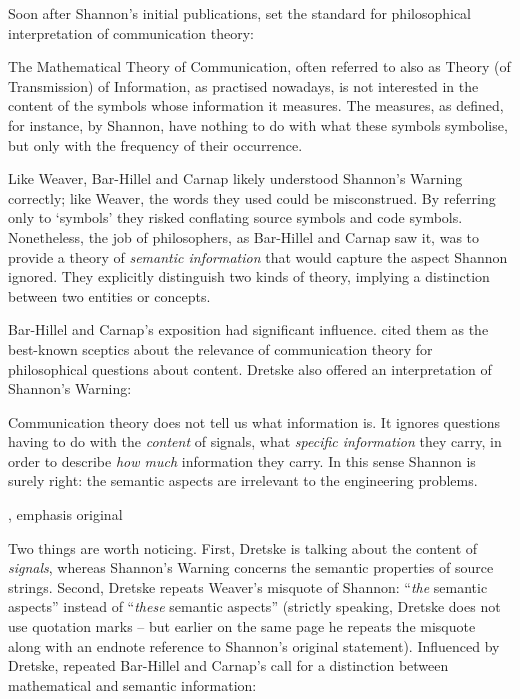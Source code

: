 \documentclass[12pt]{article}
\begin{document}
Soon after Shannon's initial publications, \citet{bar-hillel1953semantic} set the standard for philosophical interpretation of communication theory:

\begin{myquote}
The Mathematical Theory of Communication, often referred to also as Theory (of Transmission) of Information, as practised nowadays, is not interested in the content of the symbols whose information it measures. The measures, as defined, for instance, by Shannon, have nothing to do with what these symbols symbolise, but only with the frequency of their occurrence.
\par\hspace*{\fill}\citet[147]{bar-hillel1953semantic}
\end{myquote}

\noindent Like Weaver, Bar-Hillel and Carnap likely understood {\sc Shannon's Warning} correctly; like Weaver, the words they used could be misconstrued.
By referring only to `symbols' they risked conflating source symbols and code symbols.
Nonetheless, the job of philosophers, as Bar-Hillel and Carnap saw it, was to provide a theory of \textit{semantic information} that would capture the aspect Shannon ignored.
They explicitly distinguish two kinds of theory, implying a distinction between two entities or concepts.

Bar-Hillel and Carnap's exposition had significant influence.
\citet[p. 241, n.
1]{dretske1981knowledge} cited them as the best-known sceptics about the relevance of communication theory for philosophical questions about content.
Dretske also offered an interpretation of {\sc Shannon's Warning}:

\begin{myquote}
Communication theory does not tell us what information is.
It ignores questions having to do with the \emph{content} of signals, what \emph{specific information} they carry, in order to describe \emph{how much} information they carry.
In this sense Shannon is surely right: the semantic aspects are irrelevant to the engineering problems.
\par\hspace*{\fill}\citet[41]{dretske1981knowledge}, emphasis original
\end{myquote}

\noindent Two things are worth noticing.
First, Dretske is talking about the content of \textit{signals}, whereas {\sc Shannon's Warning} concerns the semantic properties of source strings.
Second, Dretske repeats Weaver's misquote of Shannon: ``\textit{the} semantic aspects'' instead of ``\textit{these} semantic aspects'' (strictly speaking, Dretske does not use quotation marks -- but earlier on the same page he repeats the misquote along with an endnote reference to Shannon's original statement).
Influenced by Dretske, \citet{dennett1983intentional} repeated Bar-Hillel and Carnap's call for a distinction between mathematical and semantic information:
\end{document}
